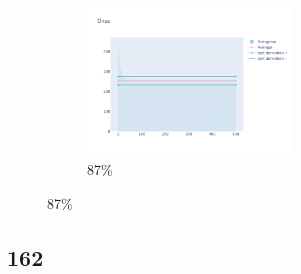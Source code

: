 \documentclass[12pt, fleqn]{report}                             %
\theoremstyle{break}                                            %
\begin{document}
\begin{figure}[ht!]
\begin{subfigure}[b]{0.4\linewidth}
          \includegraphics[width=0.6\textwidth]{Images/156/dia-d.png}
          \caption{87\%}
        \end{subfigure}
      \end{figure}


      \clearpage
      \subsection{162}
\end{document}
